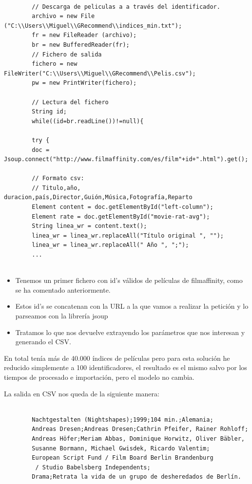 \documentclass[12pt,a4paper]{article}
\begin{document}
		\begin{verbatim}
		
		// Descarga de peliculas a a través del identificador.
		archivo = new File ("C:\\Users\\Miguel\\GRecommend\\indices_min.txt");
		fr = new FileReader (archivo);
		br = new BufferedReader(fr);
		// Fichero de salida
		fichero = new FileWriter("C:\\Users\\Miguel\\GRecommend\\Pelis.csv");
		pw = new PrintWriter(fichero);
		
		// Lectura del fichero
		String id;
		while((id=br.readLine())!=null){
		
		try {
		doc = Jsoup.connect("http://www.filmaffinity.com/es/film"+id+".html").get();	
		
		// Formato csv:
		// Titulo,año, duracion,país,Director,Guión,Música,Fotografía,Reparto
		Element content = doc.getElementById("left-column");
		Element rate = doc.getElementById("movie-rat-avg");
		String linea_wr = content.text();
		linea_wr = linea_wr.replaceAll("Título original ", "");
		linea_wr = linea_wr.replaceAll(" Año ", ";");
		...
		
		\end{verbatim}
		\begin{itemize}
		\item Tenemos un primer fichero con id's válidos de películas de filmaffinity, como se ha comentado anteriormente.
		\item Estos id's se concatenan con la URL a la que vamos a realizar la petición y lo parseamos con la librería jsoup
		\item Tratamos lo que nos devuelve extrayendo los parámetros que nos interesan y generando el CSV.		
		\end{itemize}
		
		En total tenía más de 40.000 índices de películas pero para esta solución he reducido simplemente a 100 identificadores, el resultado es el mismo salvo por los tiempos de procesado e importación, pero el modelo no cambia.
		
		La salida en CSV nos queda de la siguiente manera:
		\begin{verbatim}
		
		Nachtgestalten (Nightshapes);1999;104 min.;Alemania;
		Andreas Dresen;Andreas Dresen;Cathrin Pfeifer, Rainer Rohloff;
		Andreas Höfer;Meriam Abbas, Dominique Horwitz, Oliver Bäbler, 
		Susanne Bormann, Michael Gwisdek, Ricardo Valentim;
		European Script Fund / Film Board Berlin Brandenburg
		 / Studio Babelsberg Independents;
		Drama;Retrata la vida de un grupo de desheredados de Berlín.
		\end{verbatim}
		
\end{document}
